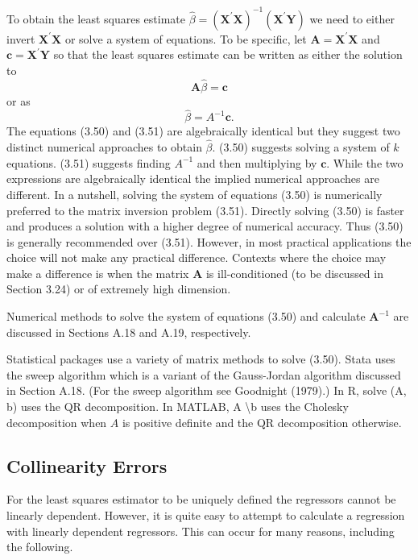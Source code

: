\documentclass[10pt]{article}
\begin{document}
To obtain the least squares estimate $\widehat{\beta}=\left(\boldsymbol{X}^{\prime} \boldsymbol{X}\right)^{-1}\left(\boldsymbol{X}^{\prime} \boldsymbol{Y}\right)$ we need to either invert $\boldsymbol{X}^{\prime} \boldsymbol{X}$ or solve a system of equations. To be specific, let $\boldsymbol{A}=\boldsymbol{X}^{\prime} \boldsymbol{X}$ and $\boldsymbol{c}=\boldsymbol{X}^{\prime} \boldsymbol{Y}$ so that the least squares estimate can be written as either the solution to
$$
\boldsymbol{A} \widehat{\beta}=\boldsymbol{c}
$$
or as
$$
\widehat{\beta}=A^{-1} \boldsymbol{c} .
$$
The equations (3.50) and (3.51) are algebraically identical but they suggest two distinct numerical approaches to obtain $\widehat{\beta}$. (3.50) suggests solving a system of $k$ equations. (3.51) suggests finding $A^{-1}$ and then multiplying by $\boldsymbol{c}$. While the two expressions are algebraically identical the implied numerical approaches are different. In a nutshell, solving the system of equations (3.50) is numerically preferred to the matrix inversion problem (3.51). Directly solving (3.50) is faster and produces a solution with a higher degree of numerical accuracy. Thus (3.50) is generally recommended over (3.51). However, in most practical applications the choice will not make any practical difference. Contexts where the choice may make a difference is when the matrix $\boldsymbol{A}$ is ill-conditioned (to be discussed in Section 3.24) or of extremely high dimension.

Numerical methods to solve the system of equations (3.50) and calculate $\boldsymbol{A}^{-1}$ are discussed in Sections A.18 and A.19, respectively.

Statistical packages use a variety of matrix methods to solve (3.50). Stata uses the sweep algorithm which is a variant of the Gauss-Jordan algorithm discussed in Section A.18. (For the sweep algorithm see Goodnight (1979).) In R, solve (A, b) uses the QR decomposition. In MATLAB, A \textbackslash b uses the Cholesky decomposition when $A$ is positive definite and the QR decomposition otherwise.

\subsection{Collinearity Errors}
For the least squares estimator to be uniquely defined the regressors cannot be linearly dependent. However, it is quite easy to attempt to calculate a regression with linearly dependent regressors. This can occur for many reasons, including the following.
\end{document}
